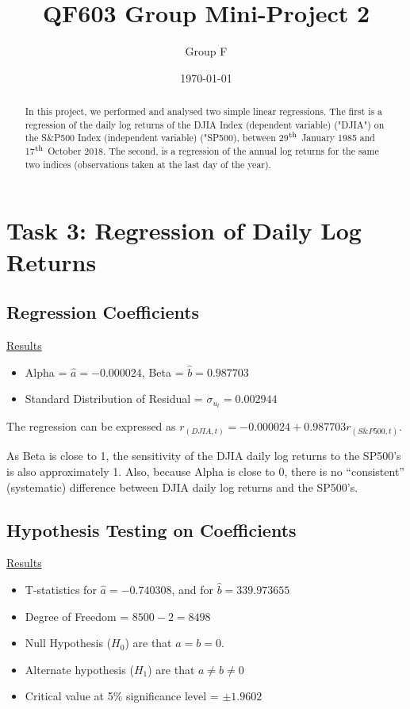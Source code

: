 \documentclass[a4paper]{article}
\title{QF603 Group Mini-Project 2}
\author{Group F}
\date{\today}
\begin{document}
	\maketitle
	
	\begin{abstract}
		In this project, we performed and analysed two simple linear regressions. The first is a regression of the daily log returns of the DJIA Index (dependent variable) ("DJIA") on the S\&P500 Index (independent variable) ("SP500), between 29$\textsuperscript{th}$ January 1985 and 17$\textsuperscript{th}$ October 2018. The second, is a regression of the annual log returns for the same two indices (observations taken at the last day of the year).
	\end{abstract} 
	
	\newpage
	\setcounter{secnumdepth}{1}
	\section*{Task 3: Regression of Daily Log Returns}
	
	\subsection{Regression Coefficients}
	\underline{Results}
	\begin{itemize}[nosep]
		\item Alpha = $\hat{a} = -0.000024$, Beta = $\hat{b} = 0.987703$
		\item Standard Distribution of Residual = $\sigma_{u_t} = 0.002944$
	\end{itemize}

	The regression can be expressed as $r_{(DJIA, t)} = -0.000024 +  0.987703 r_{(S\&P500, t)}$.
	
	As Beta is close to 1, the sensitivity of the DJIA daily log returns to the SP500's is also approximately 1.
	Also, because Alpha is close to 0, there is no ``consistent'' (systematic) difference between DJIA daily log returns and the SP500's.
	
	\subsection{Hypothesis Testing on Coefficients}
	\underline{Results}
	\begin{itemize}[nosep]
		\item T-statistics for $\hat{a} = -0.740308$, and for $\hat{b} = 339.973655$
		\item Degree of Freedom = $8500 - 2 = 8498$
		\item Null Hypothesis ($H_0$) are that $a=b=0$.
		\item Alternate hypothesis ($H_1$) are that $a\ne b\ne 0$
		\item Critical value at 5\% significance level = $\pm1.9602$
	\end{itemize}
	
\end{document}
